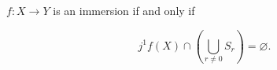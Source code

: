 $f: X \to Y$ is an immersion if and only if

$$j^1 f(X) \cap \left(\bigcup_{r \neq 0} S_r\right) = \varnothing.$$
